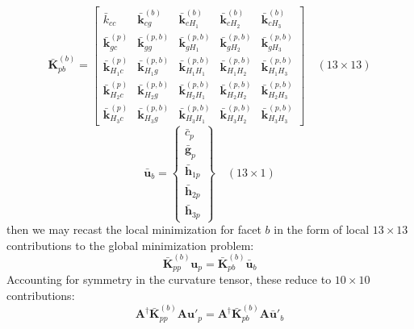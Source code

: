\documentclass[11pt]{article} %
\begin{document}
\begin{equation}
	\bar{\mathbf{K}}_{pb}^{(b)} = \left[ \begin{array}{ccccc} \bar{k}_{cc} & \bar{\mathbf{k}}_{cg}^{(b)} & \bar{\mathbf{k}}_{cH_1}^{(b)} & \bar{\mathbf{k}}_{cH_2}^{(b)} & \bar{\mathbf{k}}_{cH_3}^{(b)} \\ \bar{\mathbf{k}}_{gc}^{(p)} & \bar{\mathbf{k}}_{gg}^{(p,b)} & \bar{\mathbf{k}}_{gH_1}^{(p,b)} & \bar{\mathbf{k}}_{gH_2}^{(p,b)} & \bar{\mathbf{k}}_{gH_3}^{(p,b)} \\ \bar{\mathbf{k}}_{H_1c}^{(p)} & \bar{\mathbf{k}}_{H_1g}^{(p,b)} & \bar{\mathbf{k}}_{H_1H_1}^{(p,b)} & \bar{\mathbf{k}}_{H_1H_2}^{(p,b)} & \bar{\mathbf{k}}_{H_1H_3}^{(p,b)} \\ \bar{\mathbf{k}}_{H_2c}^{(p)} & \bar{\mathbf{k}}_{H_2g}^{(p,b)} & \bar{\mathbf{k}}_{H_2H_1}^{(p,b)} & \bar{\mathbf{k}}_{H_2H_2}^{(p,b)} & \bar{\mathbf{k}}_{H_2H_3}^{(p,b)} \\ \bar{\mathbf{k}}_{H_3c}^{(p)} & \bar{\mathbf{k}}_{H_3g}^{(p,b)} & \bar{\mathbf{k}}_{H_3H_1}^{(p,b)} & \bar{\mathbf{k}}_{H_3H_2}^{(p,b)} & \bar{\mathbf{k}}_{H_3H_3}^{(p,b)} \end{array} \right] \quad (13 \times 13)
\end{equation}
\begin{equation}
	\bar{\mathbf{u}}_b = \left\{ \begin{array}{c} \bar{c}_p \\ \bar{\mathbf{g}}_p \\ \bar{\mathbf{h}}_{1p} \\ \bar{\mathbf{h}}_{2p} \\ \bar{\mathbf{h}}_{3p} \end{array} \right\} \quad (13 \times 1)
\end{equation}
then we may recast the local minimization for facet $b$ in the form of local $13\times13$ contributions to the global minimization problem:
\begin{equation}
	\bar{\mathbf{K}}_{pp}^{(b)} \mathbf{u}_p = \bar{\mathbf{K}}_{pb}^{(b)} \bar{\mathbf{u}}_b
\end{equation}
Accounting for symmetry in the curvature tensor, these reduce to $10\times10$ contributions:
\begin{equation}
	\mathbf{A}^{\dagger} \bar{\mathbf{K}}_{pp}^{(b)} \mathbf{A} \mathbf{u}'_p = \mathbf{A}^{\dagger} \bar{\mathbf{K}}_{pb}^{(b)} \mathbf{A} \bar{\mathbf{u}}'_b
\end{equation}

\newpage
\end{document}
